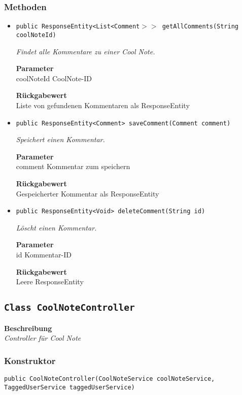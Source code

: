     \subsubsection*{Methoden}
    \begin{itemize}
    	\item{\texttt{public ResponseEntity<List<Comment$>>$ getAllComments(String coolNoteId)}}
    	
    	\textit{Findet alle Kommentare zu einer Cool Note.}
    	
    	\textbf{Parameter} \\
    	coolNoteId CoolNote-ID
    	
    	\textbf{Rückgabewert} \\
    	Liste von gefundenen Kommentaren als ResponseEntity        \item{\texttt{public ResponseEntity<Comment> saveComment(Comment comment)}}
    	
    	\textit{Speichert einen Kommentar.}
    	
    	\textbf{Parameter} \\
    	comment Kommentar zum speichern
    	
    	\textbf{Rückgabewert} \\
    	Gespeicherter Kommentar als ResponseEntity        \item{\texttt{public ResponseEntity<Void> deleteComment(String id)}}
    	
    	\textit{Löscht einen Kommentar.}
    	
    	\textbf{Parameter} \\
    	id Kommentar-ID
    	
    	\textbf{Rückgabewert} \\
    	Leere ResponseEntity
    \end{itemize}
    \subsection{\texttt{Class CoolNoteController}}
    \textbf{Beschreibung} \\
    \textit{Controller für Cool Note}
    \subsubsection*{Konstruktor}
    \texttt{public CoolNoteController(CoolNoteService coolNoteService, TaggedUserService taggedUserService)}
